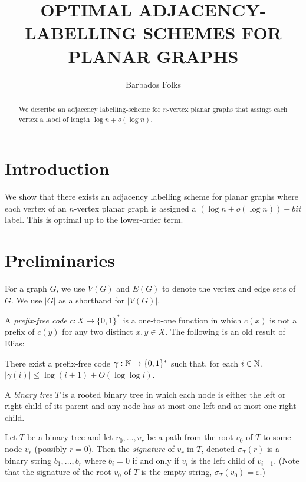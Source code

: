 \documentclass[kpfonts]{patmorin}
\title{\MakeUppercase{Optimal Adjacency-Labelling Schemes for Planar Graphs}}
\author{Barbados Folks}
\begin{document}
\begin{titlepage}
\maketitle

\begin{abstract}
  We describe an adjacency labelling-scheme for $n$-vertex planar graphs that assings each vertex a label of length $\log n+o(\log n)$.
\end{abstract}
\end{titlepage}
\tableofcontents

\newpage

\setcounter{page}{0}
\section{Introduction}


We show that there exists an adjacency labelling scheme for planar graphs where each vertex of an $n$-vertex planar graph is assigned a $(\log n+o(\log n))-bit$ label.  This is optimal up to the lower-order term.

\section{Preliminaries}

For a graph $G$, we use $V(G)$ and $E(G)$ to denote the vertex and edge sets of $G$.  We use $|G|$ as a shorthand for $|V(G)|$.

A \emph{prefix-free code} $c:X\to\{0,1\}^*$ is a one-to-one function in which $c(x)$ is not a prefix of $c(y)$ for any two distinct $x,y\in X$.
The following is an old result of Elias:

\begin{lem}
    There exist a prefix-free code $\gamma:\mathbb{N}\to\{0,1\}^*$ such that, for each $i\in\mathbb{N}$, $|\gamma(i)|\le \log(i+1)+O(\log\log i)$.
\end{lem}

A \emph{binary tree} $T$ is a rooted binary tree in which each node is either the left or right child of its parent and any node has at most one left and at most one right child.  

Let $T$ be a binary tree and let $v_0,\ldots,v_{r}$ be a path from the root $v_0$ of $T$ to some node $v_r$ (possibly $r=0$).  Then the \emph{signature} of $v_r$ in $T$, denoted $\sigma_T(r)$ is a binary string $b_1,\ldots,b_r$ where $b_i=0$ if and only if $v_{i}$ is the left child of $v_{i-1}$.  (Note that the signature of the root $v_0$ of $T$ is the empty string,  $\sigma_T(v_0)=\varepsilon$.)
\end{document}
